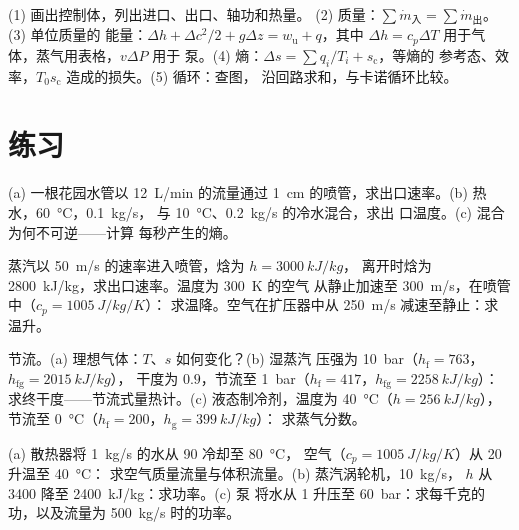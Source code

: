 \begin{method}[开口系统的平衡关系]\label{meth:b2:open-systems:method}
(1) 画出控制体，列出进口、出口、轴功和热量。
(2) 质量：$\sum\dot m_{\text{入}} = \sum\dot m_{\text{出}}$。(3) 单位质量的
能量：$\Delta h + \Delta c^2/2 + g\Delta z = w_{\text{u}} + q$，其中
$\Delta h = c_p\Delta T$ 用于气体，蒸气用表格，$v\Delta P$ 用于
泵。(4) 熵：$\Delta s = \sum q_i/T_i + s_{\text{c}}$，等熵的
参考态、效率，$T_0s_{\text{c}}$ 造成的损失。(5) 循环：查图，
沿回路求和，与卡诺循环比较。
\end{method}

\section{练习}

\begin{exercise}[$\star$]\label{exo:b2:open-systems:1}
(a) 一根花园水管以 \qty{12}{L/min} 的流量通过 \qty{1}{cm}
的喷管，求出口速率。(b) 热水，\qty{60}{\celsius}，\qty{0.1}{kg/s}，
与 \qty{10}{\celsius}、\qty{0.2}{kg/s} 的冷水混合，求出
口温度。(c) 混合为何不可逆——计算
每秒产生的熵。
\end{exercise}

\begin{exercise}[$\star$]\label{exo:b2:open-systems:2}
蒸汽以 \qty{50}{m/s} 的速率进入喷管，焓为 $h = \qty{3000}{kJ/kg}$，
离开时焓为 \qty{2800}{kJ/kg}，求出口速率。温度为 \qty{300}{K} 的空气
从静止加速至 \qty{300}{m/s}，在喷管中（$c_p = \qty{1005}{J/kg/K}$）：
求温降。空气在扩压器中从 \qty{250}{m/s} 减速至静止：求温升。
\end{exercise}

\begin{exercise}[$\star$]\label{exo:b2:open-systems:3}
节流。(a) 理想气体：$T$、$s$ 如何变化？(b) 湿蒸汽
压强为 \qty{10}{bar}（$h_{\text{f}} = 763$，$h_{\text{fg}} = \qty{2015}{kJ/kg}$），
干度为 $0.9$，节流至 \qty{1}{bar}（$h_{\text{f}} = 417$，$h_{\text{fg}}
= \qty{2258}{kJ/kg}$）：求终干度——节流式量热计。(c)
液态制冷剂，温度为 \qty{40}{\celsius}（$h = \qty{256}{kJ/kg}$），节流至
\qty{0}{\celsius}（$h_{\text{f}} = 200$，$h_{\text{g}} = \qty{399}{kJ/kg}$）：
求蒸气分数。
\end{exercise}

\begin{exercise}[$\star$]\label{exo:b2:open-systems:4}
(a) 散热器将 \qty{1}{kg/s} 的水从 \qty{90}{} 冷却至 \qty{80}{\celsius}，
空气（$c_p = \qty{1005}{J/kg/K}$）从 \qty{20}{} 升温至 \qty{40}{\celsius}：
求空气质量流量与体积流量。(b) 蒸汽涡轮机，\qty{10}{kg/s}，
$h$ 从 \qty{3400}{} 降至 \qty{2400}{kJ/kg}：求功率。(c) 泵
将水从 \qty{1}{} 升压至 \qty{60}{bar}：求每千克的功，以及流量为
\qty{500}{kg/s} 时的功率。
\end{exercise}


